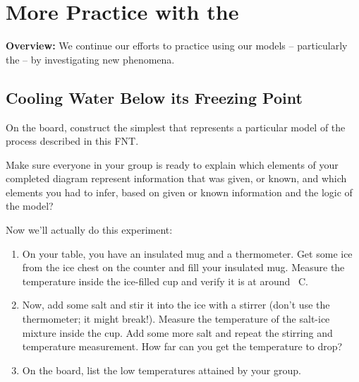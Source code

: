 \section{More Practice with the \EnergyInteractionModel{}}
\label{act1.1.8}

\begin{overview}

	\textbf{Overview:} We continue our efforts to practice using our models -- particularly the \EnergyInteractionModel{} -- by investigating new phenomena.
	
\end{overview}

\subsection{Cooling Water Below its Freezing Point}

\begin{fnt}
	
\end{fnt}


\noindent On the board, construct the simplest \EnergyDiagram{} that represents a particular model of the process described in this FNT. 

Make sure everyone in your group is ready to explain which elements of your completed diagram represent information that was given, or known, and which elements you had to infer, based on given or known information and the logic of the model? 

\WCD  

\begin{fnt}
	
\end{fnt}


\noindent Now we'll actually do this experiment:

\begin{enumerate}

	\item On your table, you have an insulated mug and a thermometer. Get some ice from the ice chest on the counter and fill your insulated mug. Measure the temperature inside the ice-filled cup and verify it is at around \unit[0]{\textdegree C}.

	\item Now, add some salt and stir it into the ice with a stirrer (don't use the thermometer; it might break!). Measure the temperature of the salt-ice mixture inside the cup. Add some more salt and repeat the stirring and temperature measurement. How far can you get the temperature to drop?

	\item On the board, list the low temperatures attained by your group.

\end{enumerate}

